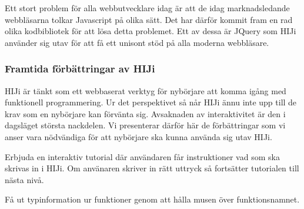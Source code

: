 Ett stort problem för alla webbutvecklare idag är att de idag marknadsledande webbläsarna tolkar Javascript på olika sätt. Det har därför kommit fram en rad olika kodbibliotek för att lösa detta problemet. Ett av dessa är JQuery som HIJi använder sig utav för att få ett unisont stöd på alla moderna webbläsare. 


\subsubsection{Framtida förbättringar av HIJi}
HIJi är tänkt som ett webbaserat verktyg för nybörjare att komma igång med funktionell programmering. Ur det perspektivet så når HIJi ännu inte upp till de krav som en nybörjare kan förvänta sig. Avsaknaden av interaktivitet är den i dagsläget största nackdelen. Vi presenterar därför här de förbättringar som vi anser vara nödvändiga för att nybörjare ska kunna använda sig utav HIJi.

Erbjuda en interaktiv tutorial där användaren får instruktioner vad som ska skrivas in i HIJi. Om använaren skriver in rätt uttryck så fortsätter tutorialen till nästa nivå.

Få ut typinformation ur funktioner genom att hålla musen över funktionsnamnet. 
